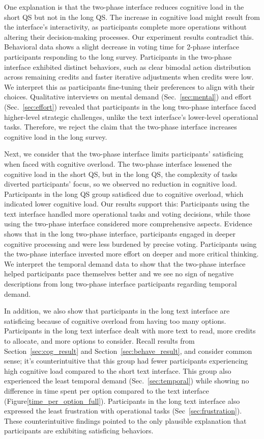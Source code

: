 One explanation is that the two-phase interface reduces cognitive load in the short QS but not in the long QS. The increase in cognitive load might result from the interface's interactivity, as participants complete more operations without altering their decision-making processes. Our experiment results contradict this. Behavioral data shows a slight decrease in voting time for 2-phase interface participants responding to the long survey. Participants in the two-phase interface exhibited distinct behaviors, such as clear bimodal action distribution across remaining credits and faster iterative adjustments when credits were low. We interpret this as participants fine-tuning their preferences to align with their choices. Qualitative interviews on mental demand (Sec.~\ref{sec:mental}) and effort (Sec.~\ref{sec:effort}) revealed that participants in the long two-phase interface faced higher-level strategic challenges, unlike the text interface's lower-level operational tasks. Therefore, we reject the claim that the two-phase interface increases cognitive load in the long survey.

Next, we consider that the two-phase interface limits participants' satisficing when faced with cognitive overload. The two-phase interface lessened the cognitive load in the short QS, but in the long QS, the complexity of tasks diverted participants' focus, so we observed no reduction in cognitive load. Participants in the long QS group satisficed due to cognitive overload, which indicated lower cognitive load. Our results support this: Participants using the text interface handled more operational tasks and voting decisions, while those using the two-phase interface considered more comprehensive aspects. Evidence shows that in the long two-phase interface, participants engaged in deeper cognitive processing and were less burdened by precise voting. Participants using the two-phase interface invested more effort on deeper and more critical thinking. We interpret the temporal demand data to show that the two-phase interface helped participants pace themselves better and we see no sign of negative descriptions from long two-phase interface participants regarding temporal demand.

In addition, we also show that participants in the long text interface are satisficing because of cognitive overload from having too many options. Participants in the long text interface dealt with more text to read, more credits to allocate, and more options to consider. Recall results from Section~\ref{sec:cog_result} and Section~\ref{sec:behave_result}, and consider common sense; it's counterintuitive that this group had fewer participants experiencing high cognitive load compared to the short text interface. This group also experienced the least temporal demand (Sec.~\ref{sec:temporal}) while showing no difference in time spent per option compared to the text interface (Figure\ref{time_per_option_full}). Participants in the long text interface also expressed the least frustration with operational tasks (Sec~\ref{sec:frustration}). These counterintuitive findings pointed to the only plausible explanation that participants are exhibiting satisficing behaviors. 

